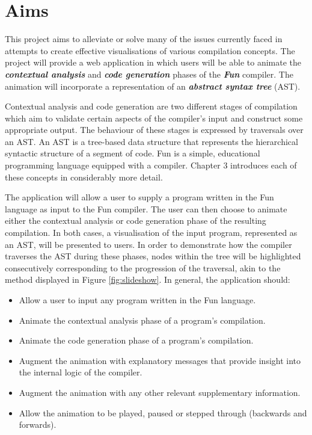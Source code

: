\documentclass{l4proj}
\begin{document}
\section{Aims}
This project aims to alleviate or solve many of the issues currently faced in attempts to create effective visualisations of various compilation concepts. The project will provide a web application in which users will be able to animate the \textit{\textbf{contextual analysis}} and \textit{\textbf{code generation}} phases of the \textit{\textbf{Fun}} compiler. The animation will incorporate a representation of an \textit{\textbf{abstract syntax tree}} (AST). 

Contextual analysis and code generation are two different stages of compilation which aim to validate certain aspects of the compiler's input and construct some appropriate output. The behaviour of these stages is expressed by traversals over an AST. An AST is a tree-based data structure that represents the hierarchical syntactic structure of a segment of code. Fun is a simple, educational programming language equipped with a compiler. Chapter 3 introduces each of these concepts in considerably more detail. 

The application will allow a user to supply a program written in the Fun language as input to the Fun compiler. The user can then choose to animate either the contextual analysis or code generation phase of the resulting compilation. In both cases, a visualisation of the input program, represented as an AST, will be presented to users. In order to demonstrate how the compiler traverses the AST during these phases, nodes within the tree will be highlighted consecutively corresponding to the progression of the traversal, akin to the method displayed in Figure \ref{fig:slideshow}. In general, the application should:
\begin{itemize}
\item Allow a user to input any program written in the Fun language.
\item Animate the contextual analysis phase of a program's compilation. 
\item Animate the code generation phase of a program's compilation.
\item Augment the animation with explanatory messages that provide insight into the internal logic of the compiler.
\item Augment the animation with any other relevant supplementary information.
\item Allow the animation to be played, paused or stepped through (backwards and forwards).
\end{itemize}
\end{document}
